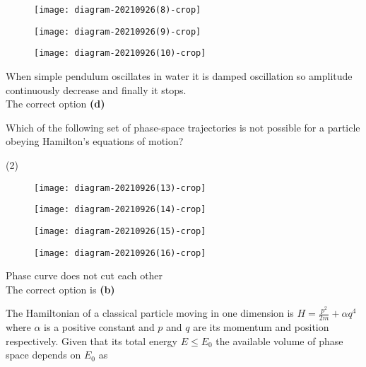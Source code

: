 \begin{enumerate}
\begin{tasks}
\begin{figure}[H]
		\centering
		\texttt{[image: diagram-20210926(8)-crop]}
	\end{figure}
	\task[\textbf{C.}]\begin{figure}[H]
		\centering
		\texttt{[image: diagram-20210926(9)-crop]}
	\end{figure}
	\task[\textbf{D.}]\begin{figure}[H]
		\centering
		\texttt{[image: diagram-20210926(10)-crop]}
	\end{figure}
\end{tasks}
\begin{answer}
 When simple pendulum oscillates in water it is damped oscillation so amplitude continuously decrease and finally it stops.\\
 The correct option \textbf{(d)}
\end{answer}
\begin{minipage}{\textwidth}
	\item Which of the following set of phase-space trajectories is not possible for a particle obeying Hamilton's equations of motion?
\end{minipage}
\begin{tasks}(2)
	\task[\textbf{A.}]\begin{figure}[H]
		\centering
		\texttt{[image: diagram-20210926(13)-crop]}
	\end{figure}
	\task[\textbf{B.}]\begin{figure}[H]
		\centering
		\texttt{[image: diagram-20210926(14)-crop]}
	\end{figure}
	\task[\textbf{C.}]\begin{figure}[H]
		\centering
		\texttt{[image: diagram-20210926(15)-crop]}
	\end{figure}
	\task[\textbf{D.}]\begin{figure}[H]
		\centering
		\texttt{[image: diagram-20210926(16)-crop]}
	\end{figure}
\end{tasks}
\begin{answer}
 Phase curve does not cut each other \\
The correct option is \textbf{(b)}
\end{answer}
\begin{minipage}{\textwidth}
	\item The Hamiltonian of a classical particle moving in one dimension is $H=\frac{p^{2}}{2 m}+\alpha q^{4}$ where $\alpha$ is a positive constant and $p$ and $q$ are its momentum and position respectively. Given that its total energy $E \leq E_{0}$ the available volume of phase space depends on $E_{0}$ as

\end{minipage}
\end{enumerate}

